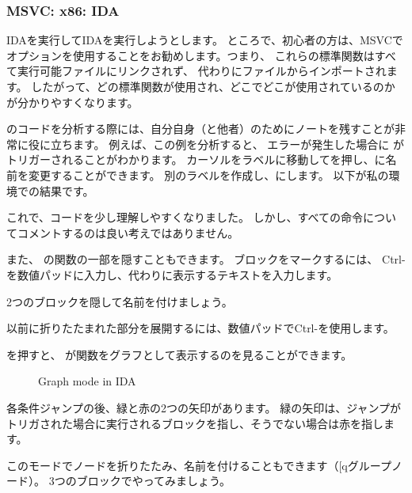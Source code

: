 \subsubsection{MSVC: x86: IDA}

IDAを実行してIDAを実行しようとします。 
ところで、初心者の方は、MSVCでオプションを使用することをお勧めします。つまり、
これらの標準関数はすべて実行可能ファイルにリンクされず、
代わりにファイルからインポートされます。 
したがって、どの標準関数が使用され、どこでどこが使用されているのかが分かりやすくなります。

\IDA のコードを分析する際には、自分自身（と他者）のためにノートを残すことが非常に役に立ちます。 
例えば、この例を分析すると、
エラーが発生した場合に \JNZ がトリガーされることがわかります。 
カーソルをラベルに移動してを押し、に名前を変更することができます。 
別のラベルを作成し、にします。 
以下が私の環境での結果です。



これで、コードを少し理解しやすくなりました。 
しかし、すべての命令についてコメントするのは良い考えではありません。

また、 \IDA の関数の一部を隠すこともできます。 
ブロックをマークするには、 Ctrl-\q{--} を数値パッドに入力し、代わりに表示するテキストを入力します。

2つのブロックを隠して名前を付けましょう。



以前に折りたたまれた部分を展開するには、数値パッドでCtrl-\q{+}を使用します。

\clearpage
{}を押すと、 \IDA が関数をグラフとして表示するのを見ることができます。

\begin{figure}[H]
\centering
{}
\caption{Graph mode in IDA}
\label{fig:ex3_IDA_1}
\end{figure}

各条件ジャンプの後、緑と赤の2つの矢印があります。 
緑の矢印は、ジャンプがトリガされた場合に実行されるブロックを指し、そうでない場合は赤を指します。

\clearpage
このモードでノードを折りたたみ、名前を付けることもできます（[q{グループノード}）。
3つのブロックでやってみましょう。

